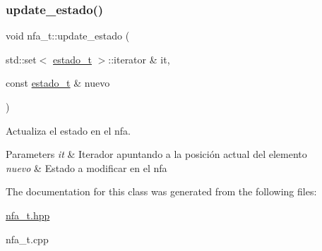 \subsubsection{\texorpdfstring{update\+\_\+estado()}{update\_estado()}}
{\footnotesize\ttfamily void nfa\+\_\+t\+::update\+\_\+estado (\begin{DoxyParamCaption}\item[{std\+::set$<$ \hyperlink{classestado__t}{estado\+\_\+t} $>$\+::iterator \&}]{it,  }\item[{const \hyperlink{classestado__t}{estado\+\_\+t} \&}]{nuevo }\end{DoxyParamCaption})}



Actualiza el estado en el nfa. 


\begin{DoxyParams}{Parameters}
{\em it} & Iterador apuntando a la posición actual del elemento \\
\hline
{\em nuevo} & Estado a modificar en el nfa \\
\hline
\end{DoxyParams}


The documentation for this class was generated from the following files\+:\begin{DoxyCompactItemize}
\item 
\hyperlink{nfa__t_8hpp}{nfa\+\_\+t.\+hpp}\item 
nfa\+\_\+t.\+cpp\end{DoxyCompactItemize}
